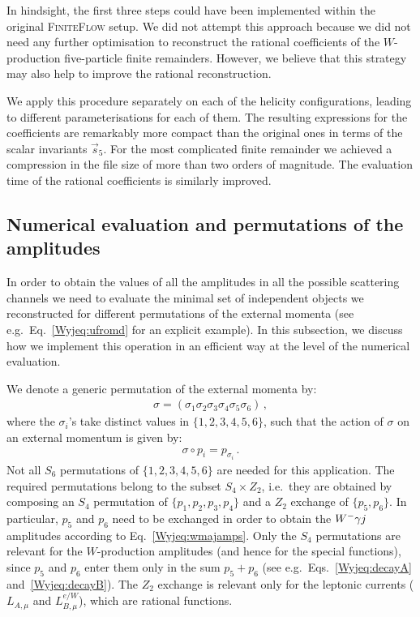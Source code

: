 \documentclass[main.tex]{subfiles}
\begin{document}
In hindsight, the first three steps could have been implemented within the original \textsc{FiniteFlow} setup. We did not attempt this approach because we did not need any further optimisation to reconstruct the rational coefficients of the $W$-production five-particle finite remainders. However, we believe that this strategy may also help to improve the rational reconstruction.

We apply this procedure separately on each of the helicity configurations, leading to different parameterisations for each of them.
The resulting expressions for the coefficients are remarkably more compact than the original ones in terms of the scalar invariants $\vec{s}_5$. For the most complicated finite remainder we achieved a compression in the file size of more than two orders of magnitude. The evaluation time of the rational coefficients is similarly improved. 
\subsection{Numerical evaluation and permutations of the amplitudes}
\label{wyjsec:Permutations}
In order to obtain the values of all the amplitudes in all the possible scattering channels we need to evaluate the minimal set of independent objects we reconstructed for different permutations of the external momenta (see e.g.\ Eq.~\eqref{Wyjeq:ufromd} for an explicit example). In this subsection, we discuss how we implement this operation in an efficient way at the level of the numerical evaluation.

We denote a generic permutation of the external momenta by:
\begin{align}
\sigma = \left(\sigma_1 \sigma_2 \sigma_3 \sigma_4\sigma_5 \sigma_6 \right) \,,
\end{align}
where the $\sigma_i$'s take distinct values in $\{1,2,3,4,5,6\}$, such that the action of $\sigma$ on an external momentum is given by:
\begin{align}
\sigma \circ p_i = p_{\sigma_i} \,.
\end{align}
Not all $S_6$ permutations of $\{1,2,3,4,5,6\}$ are needed for this application. The required permutations belong to the subset $S_4 \times Z_2$, i.e.\ 
they are obtained by composing an $S_4$ permutation of $\{p_1,p_2,p_3,p_4\}$ and a $Z_2$ exchange of  $\{p_5,p_6\}$. In particular, $p_5$ and $p_6$ need to be exchanged in order to obtain the $W^-\gamma j$ amplitudes according to Eq.~\eqref{Wyjeq:wmajamps}. Only the $S_4$ permutations are relevant for the $W$-production amplitudes (and hence for the special functions), since $p_5$ and $p_6$ enter them only in the sum $p_5+p_6$ (see e.g.\ Eqs.~\eqref{Wyjeq:decayA} and~\eqref{Wyjeq:decayB}). The $Z_2$ exchange is relevant only for the leptonic currents ($L_{A,\mu}$ and $L^{e/W}_{B,\mu}$), which are rational functions.
\end{document}
